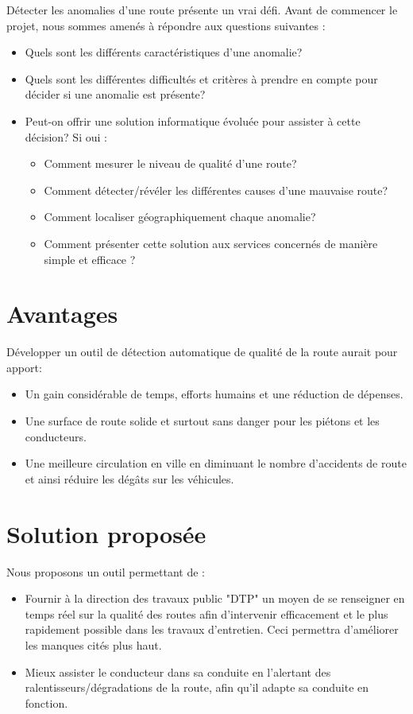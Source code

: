 Détecter les anomalies d'une route présente un vrai défi. Avant de commencer le projet,
nous sommes amenés à répondre aux questions suivantes :
\renewcommand{\labelitemi}{$\bullet$}
\begin{itemize}
  \item Quels sont les différents caractéristiques d'une anomalie?
  \item Quels sont les différentes difficultés et critères à prendre en compte pour décider si une anomalie est présente?
  \item Peut-on offrir une solution informatique évoluée pour assister à cette décision? Si oui :
        \begin{itemize}
          \item Comment mesurer le niveau de qualité d'une route?
          \item Comment détecter/révéler les différentes causes d'une mauvaise route?
          \item Comment localiser géographiquement chaque anomalie?
          \item Comment présenter cette solution aux services concernés de manière simple et efficace ?
        \end{itemize}
\end{itemize}

\section{Avantages}
Développer un outil de détection automatique de qualité de la route aurait pour apport:
\renewcommand{\labelitemi}{$\bullet$}
\begin{itemize}
  \item Un gain considérable de temps, efforts humains et une réduction de dépenses.
  \item Une surface de route solide et surtout sans danger pour les piétons et les conducteurs.
  \item Une meilleure circulation en ville en diminuant le nombre d'accidents de route et ainsi réduire les dégâts sur les véhicules.
\end{itemize}


\section{Solution proposée}
Nous proposons un outil permettant de :
\renewcommand{\labelitemi}{$\bullet$}
\begin{itemize}
  \item Fournir à la direction des travaux public "DTP" un moyen de se renseigner en temps réel sur la qualité des routes afin d'intervenir efficacement et le plus rapidement possible dans les travaux d'entretien. Ceci permettra d'améliorer les manques cités plus haut.
  \item Mieux assister le conducteur dans sa conduite en l'alertant  des ralentisseurs/dégradations de la route, afin qu'il adapte sa conduite en fonction.
\end{itemize}

